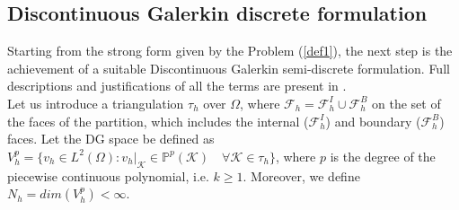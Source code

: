\documentclass[a4paper,11pt]{article}
\begin{document}
    \subsection{Discontinuous Galerkin discrete formulation}
    Starting from the strong form given by the Problem (\ref{def1}), the next step is the achievement of a suitable Discontinuous Galerkin semi-discrete formulation. Full descriptions and justifications of all the terms are present in \cite{marta} . \\
    Let us introduce a triangulation $\tau_h$ over $\Omega$, where $\mathcal{F} _h=\mathcal{F} _h^I \cup \mathcal{F} _h^B$ on the set of the faces of the partition, which includes the internal ($\mathcal{F} _h^I$) and boundary ($\mathcal{F} _h^B$) faces. Let the DG space be defined as $V_h^p = \{v_h \in L^2(\Omega) : v_h|_\mathcal{K} \in \mathbb{P}^{p}(\mathcal{K})  \quad \forall \mathcal{K} \in \tau_h \}$, where $p$ is the degree of the piecewise continuous polynomial, i.e. $k \geq 1$. Moreover, we define $N_h=dim(V_h^p)<\infty$. \vspace{4mm}
\end{document}
